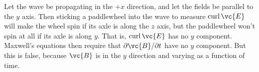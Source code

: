 Let the wave be propagating in the $+x$ direction, and let the fields be parallel
to the $y$ axis. Then sticking a paddlewheel into the wave to measure $\operatorname{curl}\vc{E}$
will make the wheel spin if its axle is along the $z$ axis, but the paddlewheel won't
spin at all if its axle is along $y$. That is, $\operatorname{curl}\vc{E}$ has no $y$ component.
Maxwell's equations then require that $\partial\vc{B}/\partial t$ have no $y$ component. But this
is false, because $\vc{B}$ is in the $y$ direction and varying as a function of time.

